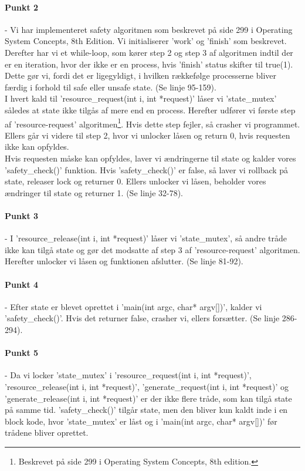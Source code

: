 \paragraph{Punkt 2} - Vi har implementeret safety algoritmen som beskrevet på side 299 i Operating System Concepts, 8th Edition. Vi initialiserer 'work' og 'finish' som beskrevet. Derefter har vi et while-loop, som kører step 2 og step 3 af algoritmen indtil der er en iteration, hvor der ikke er en process, hvis 'finish' status skifter til true(1). Dette gør vi, fordi det er ligegyldigt, i hvilken rækkefølge processerne bliver færdig i forhold til safe eller unsafe state. (Se linje 95-159).
\\I hvert kald til 'resource\_request(int i, int *request)' låser vi 'state\_mutex' således at state ikke tilgås af mere end en process. Herefter udfører vi første step af 'resource-request' algoritmen\footnote{Beskrevet på side 299 i Operating System Concepts, 8th edition.}. Hvis dette step fejler, så crasher vi programmet. Ellers går vi videre til step 2, hvor vi unlocker låsen og return 0, hvis requesten ikke kan opfyldes. 
\\Hvis requesten måske kan opfyldes, laver vi ændringerne til state og kalder vores 'safety\_check()' funktion. Hvis 'safety\_check()' er false, så laver vi rollback på state, releaser lock og returner 0. Ellers unlocker vi låsen, beholder vores ændringer til state og returner 1. (Se linje 32-78).
\paragraph{Punkt 3} - I 'resource\_release(int i, int *request)'  låser vi 'state\_mutex', så andre tråde ikke kan tilgå state og gør det modsatte af step 3 af 'resource-request' algoritmen. Herefter unlocker vi låsen og funktionen afslutter. (Se linje 81-92).
\paragraph{Punkt 4} - Efter state er blevet oprettet i 'main(int argc, char* argv[])', kalder vi 'safety\_check()'. Hvis det returner false, crasher vi, ellers forsætter. (Se linje 286-294).
\paragraph{Punkt 5} - Da vi locker 'state\_mutex' i 'resource\_request(int i, int *request)', 'resource\_release(int i, int *request)', 'generate\_request(int i, int *request)' og 'generate\_release(int i, int *request)' er der ikke flere tråde, som kan tilgå state på samme tid. 'safety\_check()' tilgår state, men den bliver kun kaldt inde i en block kode, hvor 'state\_mutex' er låst og i 'main(int argc, char* argv[])' før trådene bliver oprettet.

